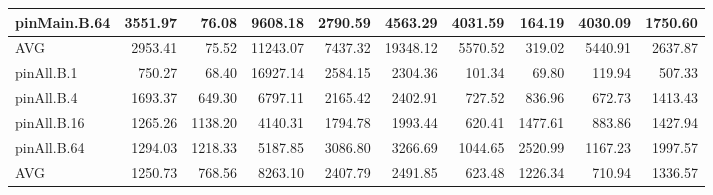 \begin{table*}[]
\begin{center}
\begin{tabular}{|l|rrrrrrrr|r|}
 pinMain.B.64 &  3551.97 &   76.08 &  9608.18 &  2790.59 &  4563.29 &  4031.59 &  164.19 &  4030.09 & 1750.60 \\
 \hline
 AVG          &  2953.41 &   75.52 & 11243.07 &  7437.32 & 19348.12 &  5570.52 &  319.02 &  5440.91 & 2637.87 \\
 \hline
 pinAll.B.1   &   750.27 &   68.40 & 16927.14 &  2584.15 &  2304.36 &   101.34 &   69.80 &   119.94 &  507.33 \\
 pinAll.B.4   &  1693.37 &  649.30 &  6797.11 &  2165.42 &  2402.91 &   727.52 &  836.96 &   672.73 & 1413.43 \\
 pinAll.B.16  &  1265.26 & 1138.20 &  4140.31 &  1794.78 &  1993.44 &   620.41 & 1477.61 &   883.86 & 1427.94 \\
 pinAll.B.64  &  1294.03 & 1218.33 &  5187.85 &  3086.80 &  3266.69 &  1044.65 & 2520.99 &  1167.23 & 1997.57 \\
 \hline
 AVG          &  1250.73 &  768.56 &  8263.10 &  2407.79 &  2491.85 &   623.48 & 1226.34 &   710.94 & 1336.57 \\

\hline
\end{tabular}
\end{center}
\end{table*}
